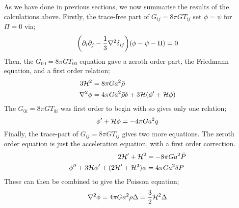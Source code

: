\begin{definitionbox}
As we have done in previous sections, we now summarise the results of the calculations above. Firstly, the trace-free part of $G_{ij} = 8\pi G T_{ij}$ set $\phi = \psi$ for $\Pi = 0$ via;
\begin{equation}
\left(\del_i \del_j - \frac{1}{3}\nabla^2 \delta_{ij}\right)(\phi - \psi - \Pi) = 0
\end{equation}
Then, the $G_{00} = 8\pi G T_{00}$ equation gave a zeroth order part, the Friedmann equation, and a first order relation;
\begin{align}
3\mathcal{H}^2 &= 8\pi Ga^2 \bar{\rho} \\
\nabla^2 \phi &= 4\pi G a^2 \bar{\rho}\delta + 3\mathcal{H}(\phi^{\prime} + \mathcal{H} \phi)
\end{align}
The $G_{0i} = 8\pi GT_{0i}$ was first order to begin with so gives only one relation;
\begin{equation}
\phi^{\prime} + \mathcal{H} \phi = -4\pi G a^2 q
\end{equation}
Finally, the trace-part of $G_{ij} = 8\pi GT_{ij}$ gives two more equations. The zeroth order equation is just the acceleration equation, with a first order correction.
\begin{align}
2\mathcal{H}^{\prime} + \mathcal{H}^2 &= -8\pi G a^2 \bar{P} \\
\phi^{\prime\prime} + 3\mathcal{H} \phi^{\prime} + (2\mathcal{H}^{\prime} + \mathcal{H}^2)\phi &= 4\pi Ga^2 \delta P
\end{align}
These can then be combined to give the Poisson equation;
\begin{equation}
\nabla^2 \phi = 4\pi G a^2 \bar{\rho} \Delta = \frac{3}{2}\mathcal{H}^2 \Delta
\end{equation}
\end{definitionbox}
